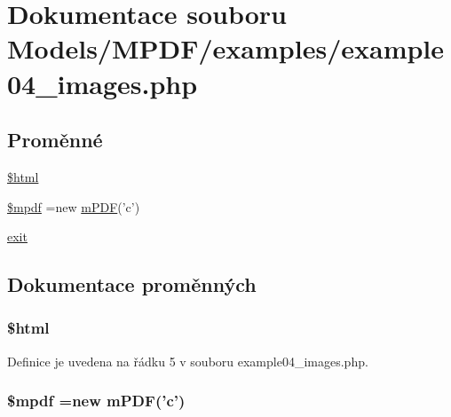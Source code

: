 \hypertarget{example04__images_8php}{\section{Dokumentace souboru Models/\-M\-P\-D\-F/examples/example04\-\_\-images.php}
\label{example04__images_8php}
}
\subsection*{Proměnné}
\begin{DoxyCompactItemize}
\item 
\hyperlink{example04__images_8php_a6f96e7fc92441776c9d1cd3386663b40}{\$html}
\item 
\hyperlink{example04__images_8php_ad028f81910d6cbab9b184d2214b3a8f8}{\$mpdf} =new \hyperlink{classm_p_d_f}{m\-P\-D\-F}('c')
\item 
\hyperlink{example04__images_8php_a6733eb5f605d09eaede9845835d71c4e}{exit}
\end{DoxyCompactItemize}


\subsection{Dokumentace proměnných}
\hypertarget{example04__images_8php_a6f96e7fc92441776c9d1cd3386663b40}{
\subsubsection[{\$html}]{\setlength{\rightskip}{0pt plus 5cm}\$html}}\label{example04__images_8php_a6f96e7fc92441776c9d1cd3386663b40}


Definice je uvedena na řádku 5 v souboru example04\-\_\-images.\-php.

\hypertarget{example04__images_8php_ad028f81910d6cbab9b184d2214b3a8f8}{
\subsubsection[{\$mpdf}]{\setlength{\rightskip}{0pt plus 5cm}\$mpdf =new {\bf m\-P\-D\-F}('c')}}\label{example04__images_8php_ad028f81910d6cbab9b184d2214b3a8f8}



